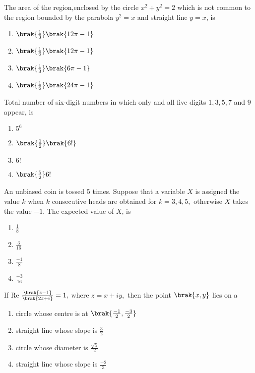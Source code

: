 \iffalse
    \title{2020}
    \author{EE24BTECH11029}
    \section{mcq-single}
\fi 

  \item The area of the region,enclosed by the circle $x^2+y^2=2$ which is not common to the region bounded by the parabola $y^2=x$ and straight line $y=x$, is
    \begin{enumerate}
        \item $\brak{\frac{1}{3}}\brak{12\pi-1}$
        \item $\brak{\frac{1}{6}}\brak{12\pi-1}$
        \item $\brak{\frac{1}{3}}\brak{6\pi-1}$
        \item $\brak{\frac{1}{6}}\brak{24\pi-1}$\\
    \end{enumerate}
    \item Total number of six-digit numbers in which only and all five digits $1,3,5,7$ and $9$ appear, is
    \begin{enumerate}
        \item $5^6$
        \item $\brak{\frac{1}{2}}\brak{6!}$
        \item $6!$
        \item $\brak{\frac{5}{2}}6!$\\
    \end{enumerate}
    \item An unbiased coin is tossed $5$ times. Suppose that a variable $X$ is assigned the value $k$ when $k$ consecutive heads are obtained for  $k= 3, 4, 5,$ otherwise $X$ takes the value $-1$. The expected value of $X$, is
    \begin{enumerate}
        \item $\frac{1}{8}$
        \item $\frac{3}{16}$
        \item $\frac{-1}{8}$
        \item $\frac{-3}{16}$\\
    \end{enumerate}
    \item If Re $\frac{\brak{z-1}}{\brak{2z+i}}=1,$ where $z=x+iy,$ then the point $\brak{x,y}$ lies on a 
    \begin{enumerate}
        \item circle whose centre is at $\brak{\frac{-1}{2},\frac{-3}{2}}$
        \item straight line whose slope is $\frac{3}{2}$
        \item circle whose diameter is $\frac{\sqrt{5}}{2}$
        \item straight line whose slope is $\frac{-2}{3}$\\
    \end{enumerate}
